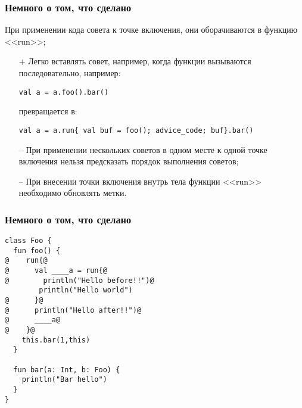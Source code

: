 \documentclass{beamer}
\begin{document}
    \begin{frame}[fragile=singleslide]
    	\frametitle{Немного о том, что сделано}
    	При применении кода совета к точке включения, они оборачиваются в
    	функцию <<run>>;
    	\begin{itemize}
    		\item[+] Легко вставлять совет, например, когда функции вызываются
    		  последовательно, например:
    		  \begin{lstlisting}[frame=single,style=base]
val a = a.foo().bar()
    		  \end{lstlisting}
    		  превращается в:
    		  \begin{lstlisting}[frame=single,style=base]
val a = a.run{ val buf = foo(); advice_code; buf}.bar()
    		  \end{lstlisting}
    		\item [--] При применении нескольких советов в одном месте к одной
              точке включения нельзя предсказать порядок выполнения советов;
    		\item [--] При внесении точки включения внутрь тела функции <<run>>
    		  необходимо обновлять метки.
    	\end{itemize}
    \end{frame}

    \begin{frame}[fragile=singleslide]
    	\frametitle{Немного о том, что сделано}
    		\begin{lstlisting}[frame=single,style=base]
class Foo {
  fun foo() {
@    run{@
@      val ____a = run{@
@        println("Hello before!!")@
        println("Hello world")
@      }@
@      println("Hello after!!")@
@      ____a@
@    }@
    this.bar(1,this)
  }

  fun bar(a: Int, b: Foo) {
    println("Bar hello")
  }
}
    	\end{lstlisting}
    \end{frame}
\end{document}
